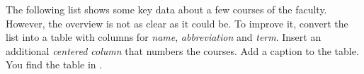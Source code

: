 The following list shows some key data about a few courses of the  faculty.
However, the overview is not as clear as it could be.
To improve it, convert the list into a table with columns for \emph{name}, \emph{abbreviation} and \emph{term}.
Insert an additional \emph{centered column} that numbers the courses. 
Add a caption to the table.
You find the table in .



